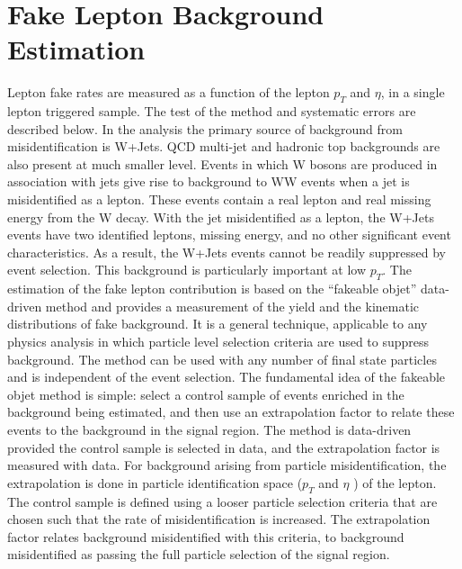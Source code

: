 \section{Fake Lepton Background Estimation}
Lepton fake rates are measured as a
function of the lepton $p_T$ and $\eta$, in a single lepton triggered sample. The test of the method and
systematic errors are described below.
In the analysis
the primary source of background from misidentification is W+Jets. QCD multi-jet and hadronic top backgrounds
are also present at much smaller level. Events in which W bosons are produced in association
with jets give rise to background to WW events when a jet is misidentified as a lepton. These
events contain a real lepton and real missing energy from the W decay. With the jet misidentified 
as a lepton, the W+Jets events have two identified leptons, missing energy, and no other
significant event characteristics. As a result, the W+Jets events cannot be readily suppressed
by event selection. This background is particularly important at low $p_T$.
The estimation of the fake lepton contribution is based on the ``fakeable objet'' data-driven
method and provides a measurement of the yield and the kinematic distributions of fake background. 
It is a general technique, applicable to any physics analysis in which particle level
selection criteria are used to suppress background. The method can be used with any number
of final state particles and is independent of the event selection.
The fundamental idea of the fakeable objet method is simple: select a control sample of events
enriched in the background being estimated, and then use an extrapolation factor to relate these
events to the background in the signal region. The method is data-driven provided the control
sample is selected in data, and the extrapolation factor is measured with data. For background
arising from particle misidentification, the extrapolation is done in particle identification space
($p_T$ and $\eta$ ) of the lepton. The control sample is defined using a looser particle selection criteria
that are chosen such that the rate of misidentification is increased. The extrapolation factor
relates background misidentified with this criteria, to background misidentified as passing the
full particle selection of the signal region.
